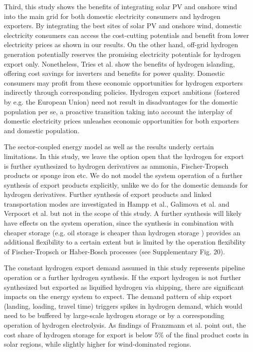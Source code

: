 \documentclass[5p,numafflabel]{elsarticle}
\begin{document}
Third, this study shows the benefits of integrating solar PV and onshore wind into the main grid for both domestic electricity consumers and hydrogen exporters. By integrating the best sites of solar PV and onshore wind, domestic electricity consumers can access the cost-cutting potentials and benefit from lower electricity prices as shown in our results. On the other hand, off-grid hydrogen generation potentially reserves the promising electricity potentials for hydrogen export only. Nonetheless, Tries et al.\cite{Tries2023b} show the benefits of hydrogen islanding, offering cost savings for inverters and benefits for power quality. Domestic consumers may profit from these economic opportunities for hydrogen exporters indirectly through corresponding policies.
Hydrogen export ambitions (fostered by e.g. the European Union) need not result in disadvantages for the domestic population per se, a proactive transition taking into account the interplay of domestic electricity prices unleashes economic opportunities for both exporters and domestic population.



The sector-coupled energy model as well as the results underly certain limitations. In this study, we leave the option open that the hydrogen for export is further synthesized to hydrogen derivatives as ammonia, Fischer-Tropsch products or sponge iron etc. We do not model the system operation of a further synthesis of export products explicitly, unlike we do for the domestic demands for hydrogen derivatives. Further synthesis of export products and linked transportation modes are investigated in Hampp et al.\cite{Hampp2023}, Galimova et al.\cite{Galimova2023} and Verpoort et al.\cite{Verpoort2024} but not in the scope of this study.
A further synthesis will likely have effects on the system operation, since the synthesis in combination with cheaper storage (e.g. oil storage is cheaper than hydrogen storage \cite{DEA2019TechnologyData}) provides an additional flexibility to a certain extent but is limited by the operation flexibility of Fischer-Tropsch or Haber-Bosch processes (see Supplementary Fig. 20). %

The constant hydrogen export demand assumed in this study represents pipeline operation or a further hydrogen synthesis.
If the export hydrogen is not further synthesized but exported as liquified hydrogen via shipping, there are significant impacts on the energy system to expect. The demand pattern of ship export (landing, loading, travel time) triggers spikes in hydrogen demand, which would need to be buffered by large-scale hydrogen storage or by a corresponding operation of hydrogen electrolysis. As findings of Franzmann et al. \cite{Franzmann2023} point out, the cost share of hydrogen storage for export is below 5\% of the final product costs in solar regions, while slightly higher for wind-dominated regions.
\end{document}
